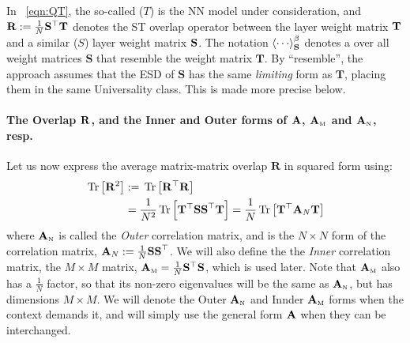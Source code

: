 In \EQN~\ref{eqn:QT}, the so-called \emph{\Teacher} ($T$) is the NN model under consideration,
and 
$\mathbf{R}:=\frac{1}{N}{\mathbf{S}^{\top}\mathbf{T}}$
denotes the ST overlap operator 
between the \Teacher layer weight matrix ${\mathbf{T}}$ and a similar \emph{\Student} ($S$) layer weight matrix ${\mathbf{S}}$.
The notation $\THRMAVGIZ{\cdots}$ denotes a \ThermalAverage over
all \Student weight matrices $\mathbf{S}$ that resemble the \Teacher weight matrix $\mathbf{T}$.
By ``resemble'', the \SETOL approach assumes that 
the ESD of $\mathbf{S}$ has the same \emph{limiting} form as $\mathbf{T}$, placing them in the same \HTSR Universality class.
This is made more precise below.

\paragraph{The Overlap $\mathbf{R}$, and the Inner and Outer forms of $\mathbf{A}$, ${\mathbf{A}}_{\text{\tiny M}}$ and ${\mathbf{A}}_{\text{\tiny N}}$, resp.}
Let us now express the average matrix-matrix overlap $\mathbf{R}$ in squared form using:
\begin{align}
  \label{eqn:R2}
\mbox{}\operatorname{Tr}\left[\mathbf{R}^{2}\right] &:=\mbox{}\operatorname{Tr}\left[\mathbf{R}^{\top}\mathbf{R}\right]  \\ \nonumber
&=\frac{1}{N^{2}}\mbox{}\operatorname{Tr}\left[\mathbf{T}^{\top}\mathbf{SS}^{\top}\mathbf{T}\right]
=\frac{1}{N}\mbox{}\operatorname{Tr}\left[\mathbf{T}^{\top}\mathbf{A}_N\mathbf{T}\right]
\end{align}
where ${\mathbf{A}}_{\text{\tiny N}}$ is called the \emph{Outer} \Student correlation matrix, and is  the $N\times N$ form of the \Student correlation matrix,  
$\mathbf{A}_N:=\frac{1}{N}\mathbf{SS}^{\top}$.
We will also define the  the \emph{Inner} \Student correlation matrix,  the $M\times M$ matrix, ${\mathbf{A}}_{\text{\tiny M}}=\frac{1}{N}\mathbf{S}^{\top}\mathbf{S}$, which is 
used later. Note that ${\mathbf{A}}_{\text{\tiny M}}$ also has a $\frac 1 N$ factor, so that its non-zero eigenvalues will be the same as ${\mathbf{A}}_{\text{\tiny N}}$, but has dimensions $M \times M$. We will denote the Outer  ${\mathbf{A}}_{\text{\tiny N}}$ and Innder ${\mathbf{A}}_{\text{\tiny M}}$ forms when the context demands it, and will simply use the general form $\mathbf{A}$ when they can be interchanged.


